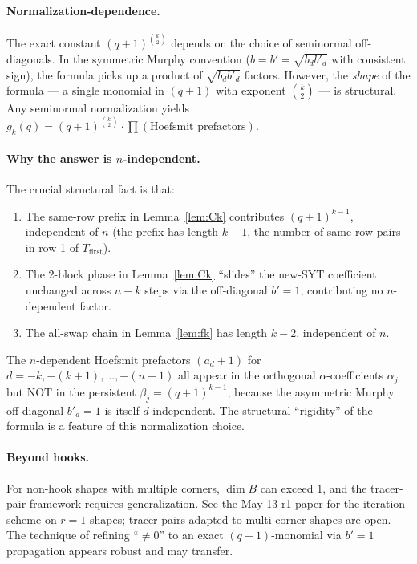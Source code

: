 \documentclass[11pt]{article}
\theoremstyle{definition}
\begin{document}
\paragraph{Normalization-dependence.}  The exact constant $(q+1)^{\binom{k}{2}}$
depends on the choice of seminormal off-diagonals.  In the symmetric
Murphy convention ($b = b' = \sqrt{b_d b'_d}$ with consistent sign), the
formula picks up a product of $\sqrt{b_d b'_d}$ factors.  However, the
\emph{shape} of the formula --- a single monomial in $(q+1)$ with
exponent $\binom{k}{2}$ --- is structural.  Any seminormal normalization
yields $g_k(q) = (q+1)^{\binom{k}{2}} \cdot \prod (\text{Hoefsmit prefactors})$.

\paragraph{Why the answer is $n$-independent.}  The crucial structural
fact is that:
\begin{enumerate}[leftmargin=2em,topsep=0.2em,itemsep=0.1em,label=(\roman*)]
\item The same-row prefix in Lemma~\ref{lem:Ck} contributes $(q+1)^{k-1}$,
   independent of $n$ (the prefix has length $k - 1$, the number of
   same-row pairs in row 1 of $T_{\mathrm{first}}$).
\item The 2-block phase in Lemma~\ref{lem:Ck} ``slides'' the new-SYT
   coefficient unchanged across $n - k$ steps via the off-diagonal
   $b' = 1$, contributing no $n$-dependent factor.
\item The all-swap chain in Lemma~\ref{lem:fk} has length $k - 2$,
   independent of $n$.
\end{enumerate}
The $n$-dependent Hoefsmit prefactors $(a_d + 1)$ for $d = -k, -(k+1),
\ldots, -(n-1)$ all appear in the orthogonal $\alpha$-coefficients
$\alpha_j$ but NOT in the persistent $\beta_j = (q+1)^{k-1}$, because
the asymmetric Murphy off-diagonal $b'_d = 1$ is itself $d$-independent.
The structural ``rigidity'' of the formula is a feature of this
normalization choice.

\paragraph{Beyond hooks.}  For non-hook shapes with multiple corners,
$\dim B$ can exceed $1$, and the tracer-pair framework requires
generalization.  See the May-13 r1 paper for the iteration scheme on
$r = 1$ shapes; tracer pairs adapted to multi-corner shapes are
open.  The technique of refining ``$\ne 0$'' to an exact $(q+1)$-monomial
via $b' = 1$ propagation appears robust and may transfer.
\end{document}
